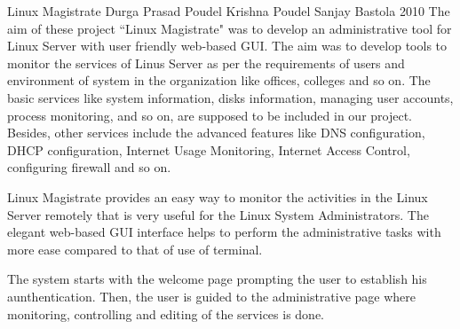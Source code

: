 \begin{conf-abstract}[]
{Linux Magistrate}
{ 
Durga Prasad Poudel
Krishna Poudel
Sanjay Bastola
}
{2010}
The aim of these project ``Linux Magistrate" was to develop an administrative tool for Linux Server with user friendly web-based GUI. The aim was to develop tools to monitor the services of Linus Server as per the requirements of users and environment of system in the organization like offices, colleges and so on. The basic services like system information, disks information, managing user accounts, process monitoring, and so on, are supposed to be included in our project. Besides, other services include the advanced features like DNS configuration, DHCP configuration, Internet Usage Monitoring, Internet Access Control, configuring firewall and so on.

Linux Magistrate provides an easy way to monitor the activities in the Linux Server remotely that is very useful for the Linux System Administrators. The elegant web-based GUI interface helps to perform the administrative tasks with more ease compared to that of use of terminal.

The system starts with the welcome page prompting the user to establish his aunthentication. Then, the user is guided to the administrative page where monitoring, controlling and editing of the services is done.
\end{conf-abstract}